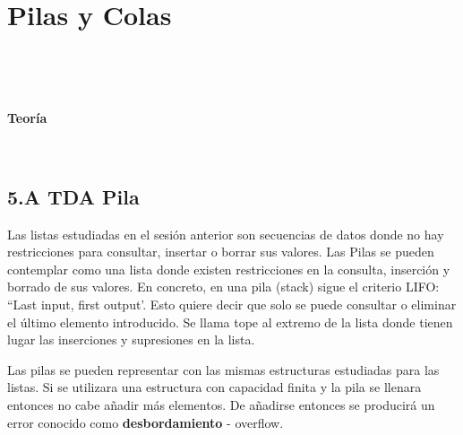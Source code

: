 


\chapter{Pilas y Colas}

\localtableofcontents

\

\

\centerline{\Large \bf Teoría}

\formatoNormal

\



\section*{5.A TDA Pila}
\label{sec:Pila}

Las listas estudiadas en el sesión anterior son secuencias de datos donde no hay restricciones para consultar, insertar o borrar sus valores.
Las Pilas se pueden contemplar como una lista donde existen restricciones en la consulta, inserción y borrado de sus valores.
En concreto, en una  pila (stack) sigue el criterio LIFO: ``Last input, first output'. Esto quiere decir que solo se puede consultar o eliminar el último elemento introducido. Se llama tope al extremo de la lista donde tienen lugar las inserciones y supresiones en la lista.








Las pilas se pueden representar con las mismas estructuras estudiadas para las listas. 
Si se utilizara una estructura con capacidad finita y la pila se llenara entonces no cabe añadir más elementos. De añadirse entonces se producirá un error conocido como \textbf{desbordamiento} - overflow.

